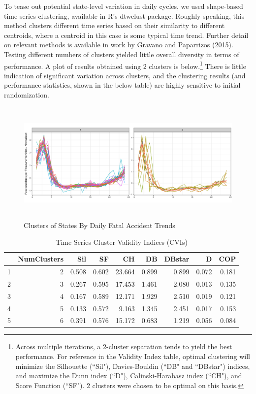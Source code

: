 \documentclass[11pt, oneside,titlepage]{article}   	%
\begin{document}
To tease out potential state-level variation in daily cycles, we used shape-based time series clustering, available in R's dtwclust package. Roughly speaking, this method clusters different time series based on their similarity to different centroids, where a centroid in this case is some typical time trend. Further detail on relevant methods is available in work by Gravano and Paparrizos (2015). Testing different numbers of clusters yielded little overall diversity in terms of performance. A plot of results obtained using 2 clusters is below.\footnote{Across multiple iterations, a 2-cluster separation tends to yield the best performance. For reference in the Validity Index table, optimal clustering will minimize the Silhouette (``Sil"), Davies-Bouldin (``DB" and ``DBstar") indices, and maximize the Dunn index (``D"), Calinski-Harabasz index (``CH"), and Score Function (``SF"). 2 clusters were chosen to be optimal on this basis.} There is little indication of significant variation across clusters, and the clustering results (and performance statistics, shown in the below table) are highly sensitive to initial randomization. 

\begin{figure}[H]
\begin{center}
\includegraphics[width=.75\textwidth,height=6cm,keepaspectratio]{StateClusterPlot_Hourly.png}
\end{center}
\caption{Clusters of States By Daily Fatal Accident Trends}
\end{figure}

\begin{table}[H]
\centering
\begin{tabular}{rrrrrrrrr}
  \hline
 & NumClusters & Sil & SF & CH & DB & DBstar & D & COP \\ 
  \hline
1 & 2 & 0.508 & 0.602 & 23.664 & 0.899 & 0.899 & 0.072 & 0.181 \\ 
  2 & 3 & 0.267 & 0.595 & 17.453 & 1.461 & 2.080 & 0.013 & 0.135 \\ 
  3 & 4 & 0.167 & 0.589 & 12.171 & 1.929 & 2.510 & 0.019 & 0.121 \\ 
  4 & 5 & 0.133 & 0.572 & 9.163 & 1.345 & 2.451 & 0.017 & 0.153 \\ 
  5 & 6 & 0.391 & 0.576 & 15.172 & 0.683 & 1.219 & 0.056 & 0.084 \\ 
   \hline
\end{tabular}
\caption{Time Series Cluster Validity Indices (CVIs)} 
\end{table}
\end{document}
